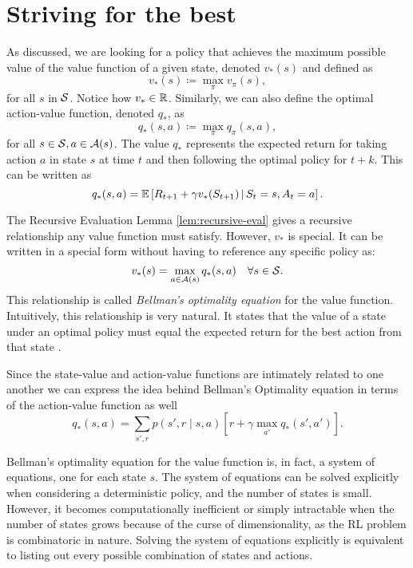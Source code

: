 \section{Striving for the best}

As discussed, we are looking for a policy that achieves the maximum possible value
of the value function of a given state, denoted $v_*(s)$ and defined as
\[
	v_* (s) \coloneqq \max_{\pi} v_\pi (s),
\]
for all $s$ in $\mathcal{S}$. Notice how $v_* \in \mathbb{R}$. Similarly, we can also
define the optimal action-value function, denoted $q_*$, as
\[
	q_* (s, a) \coloneqq \max_{\pi} q_\pi (s, a),
\]
for all $s \in \mathcal{S}, a \in \mathcal{A}(s)$. The value $q_*$ represents the
expected return for taking action $a$ in state $s$ at time $t$ and then
following the optimal policy for $t+k$. This can be written as
\[
	q_{*} (s, a) = \mathbb{E} \left[ R_{t+1} + \gamma v_* (S_{t+1}) \,\middle\vert\, S_t = s, A_t = a \right].
\]

The Recursive Evaluation Lemma \ref{lem:recursive-eval} gives a recursive
relationship any value function must satisfy. However, $v_*$ is special. It can
be written in a special form \cite{bellman1957,SuttonBarto,raoRL4F} without
having to reference any specific policy as:
\begin{equation}
	\label{eq:prop-dependencia-vq}
	v_* (s) = \max_{a \in \mathcal{A}(s)} q_* (s, a) \quad \forall s \in \mathcal{S}.
\end{equation}
This relationship is called \textit{Bellman's optimality equation} for the value
function. Intuitively, this relationship is very natural. It states that the
value of a state under an optimal policy must equal the expected return for the
best action from that state \cite[Ch.~3.6]{SuttonBarto}.

Since the state-value and action-value functions are intimately related to one
another we can express the idea behind Bellman's Optimality equation in terms of
the action-value function as well
\[
	q_* (s, a) = \sum_{s', r} p(s', r \mid s, a) \left[ r + \gamma \max_{a'} q_{*} (s', a') \right].
\]

Bellman's optimality equation for the value function is, in fact, a system of
equations, one for each state $s$. The system of equations can be solved
explicitly when considering a deterministic policy, and the number of states is
small. However, it becomes computationally inefficient or simply intractable
when the number of states grows because of the curse of dimensionality, as the
RL problem is combinatoric in nature. Solving the system of equations explicitly
is equivalent to listing out every possible combination of states and actions.


